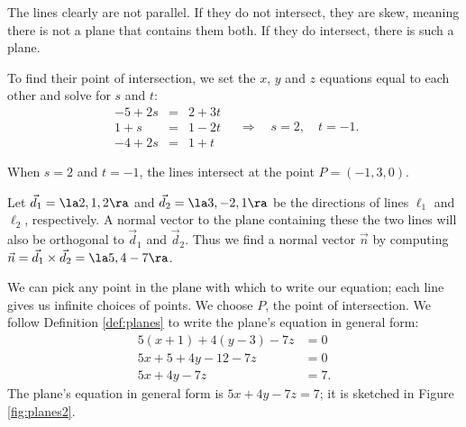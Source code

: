 {The lines clearly are not parallel. If they do not intersect, they are skew, meaning there is not a plane that contains them both. If they do intersect, there is such a plane. 

To find their point of intersection, we set the $x$, $y$ and $z$ equations equal to each other and solve for $s$ and $t$:
\[
\begin{array}{ccc}
-5+2s &=&2+3t \\ 1+s &=& 1-2t \\ -4+2s &=& 1+t 
\end{array}\quad  \Rightarrow  \quad s=2,\quad t=-1.
\]

When $s=2$ and $t=-1$, the lines intersect at the point $P= (-1,3,0)$. 

Let $\vec d_1 = \la 2,1,2\ra$ and $\vec d_2=\la 3,-2,1\ra$ be the directions of lines $\ell_1$ and $\ell_2$, respectively. A normal vector to the plane containing these the two lines will also be orthogonal to $\vec d_1$ and $\vec d_2$. Thus we find a normal vector $\vec n$ by computing $\vec n = \vec d_1 \times \vec d_2= \la 5,4-7\ra$.

We can pick any point in the plane with which to write our equation; each line gives us infinite choices of points. We choose $P$, the point of intersection. We follow Definition \ref{def:planes} to write the plane's equation in general form:
\begin{align*}
5(x+1) +4(y-3) -7z &= 0 \\
5x + 5 + 4y-12 -7z &= 0\\
5x+4y-7z &= 7.
\end{align*}
The plane's equation in general form is $5x+4y-7z=7$; it is sketched in Figure \ref{fig:planes2}.
}\\

